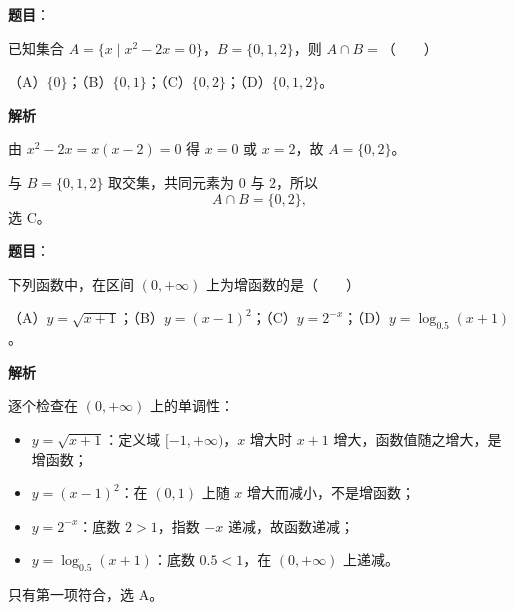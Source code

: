 

\begin{answer}

\textbf{题目}：

已知集合 $A=\{x\mid x^2-2x=0\}$，$B=\{0,1,2\}$，则 $A\cap B=$\mbox{（　　）}

（A）$\{0\}$；（B）$\{0,1\}$；（C）$\{0,2\}$；（D）$\{0,1,2\}$。

\textbf{解析}

由 $x^2-2x=x(x-2)=0$ 得 $x=0$ 或 $x=2$，故 $A=\{0,2\}$。

与 $B=\{0,1,2\}$ 取交集，共同元素为 $0$ 与 $2$，所以
\nopagebreak[4]
\[A\cap B=\{0,2\},\]
选 C。


\end{answer}
\begin{answer}

\textbf{题目}：

下列函数中，在区间 $(0,+\infty)$ 上为增函数的是\mbox{（　　）}

（A）$y=\sqrt{x+1}$；（B）$y=(x-1)^2$；（C）$y=2^{-x}$；（D）$y=\log_{0.5}(x+1)$。

\textbf{解析}

逐个检查在 $(0,+\infty)$ 上的单调性：

\begin{itemize}
\item $y=\sqrt{x+1}$：定义域 $[-1,+\infty)$，$x$ 增大时 $x+1$ 增大，函数值随之增大，是增函数；
\item $y=(x-1)^2$：在 $(0,1)$ 上随 $x$ 增大而减小，不是增函数；
\item $y=2^{-x}$：底数 $2>1$，指数 $-x$ 递减，故函数递减；
\item $y=\log_{0.5}(x+1)$：底数 $0.5<1$，在 $(0,+\infty)$ 上递减。
\end{itemize}

只有第一项符合，选 A。


\end{answer}
